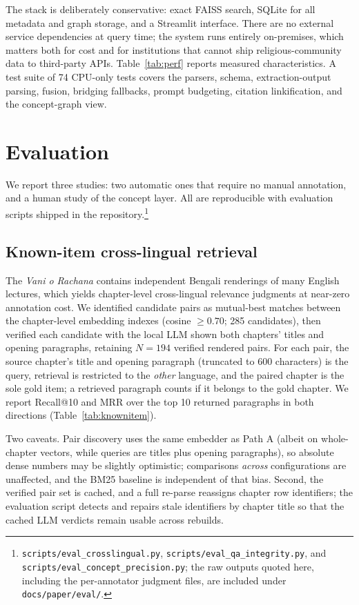 \documentclass[11pt,a4paper]{article}
\begin{document}
The stack is deliberately conservative: exact FAISS search, SQLite for
all metadata and graph storage, and a Streamlit interface. There are no
external service dependencies at query time; the system runs entirely
on-premises, which matters both for cost and for institutions that
cannot ship religious-community data to third-party APIs.
Table~\ref{tab:perf} reports measured characteristics. A test suite of
74 CPU-only tests covers the parsers, schema, extraction-output
parsing, fusion, bridging fallbacks, prompt budgeting, citation
linkification, and the concept-graph view.

\section{Evaluation}
\label{sec:eval}

We report three studies: two automatic ones that require no manual
annotation, and a human study of the concept layer. All are reproducible
with evaluation scripts shipped in the
repository.\footnote{\texttt{scripts/eval\_crosslingual.py},
\texttt{scripts/eval\_qa\_integrity.py}, and
\texttt{scripts/eval\_concept\_precision.py}; the raw outputs quoted
here, including the per-annotator judgment files, are included under
\texttt{docs/paper/eval/}.}

\subsection{Known-item cross-lingual retrieval}
\label{sec:eval-knownitem}

The \emph{Vani o Rachana} contains independent Bengali renderings of many
English lectures, which yields chapter-level cross-lingual relevance
judgments at near-zero annotation cost. We identified candidate pairs as
mutual-best matches between the chapter-level embedding indexes (cosine
$\geq 0.70$; 285 candidates), then verified each candidate with the local
LLM shown both chapters' titles and opening paragraphs, retaining
$N = 194$ verified rendered pairs. For each pair, the source chapter's
title and opening paragraph (truncated to 600 characters) is the query,
retrieval is restricted to the \emph{other} language, and the paired
chapter is the sole gold item; a retrieved paragraph counts if it belongs
to the gold chapter. We report Recall@10 and MRR over the top 10 returned
paragraphs in both directions (Table~\ref{tab:knownitem}).

Two caveats. Pair discovery uses the same embedder as Path A (albeit on
whole-chapter vectors, while queries are titles plus opening paragraphs),
so absolute dense numbers may be slightly optimistic; comparisons
\emph{across} configurations are unaffected, and the BM25 baseline is
independent of that bias. Second, the verified pair set is cached, and a
full re-parse reassigns chapter row identifiers; the evaluation script
detects and repairs stale identifiers by chapter title so that the cached
LLM verdicts remain usable across rebuilds.
\end{document}

